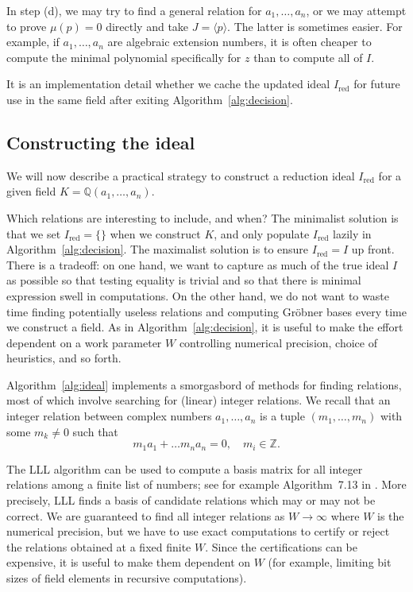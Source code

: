 \documentclass[sigconf,screen,urlbreakonhyphens]{acmart}
\begin{document}
In step (d), we may try to find a general relation
for $a_1,\ldots,a_n$,
or we may attempt to prove $\mu(p) = 0$ directly
and take $J = \langle p \rangle$. The latter is sometimes easier.
For example, if $a_1,\ldots,a_n$ are algebraic extension numbers,
it is often cheaper to compute the minimal polynomial
specifically for $z$ than to compute all of $I$.

It is an implementation detail whether we cache the updated
ideal $I_{\text{red}}$ for future use
in the same field after exiting Algorithm~\ref{alg:decision}.

\subsection{Constructing the ideal}

\label{sect:ideal}

We will now describe a practical strategy to construct a reduction ideal
$I_{\text{red}}$ for a given field $K = \mathbb{Q}(a_1,\ldots,a_n)$.

Which relations are interesting to include, and when?
The minimalist solution is that we set $I_{\text{red}} = \{\}$
when we construct $K$, and only populate $I_{\text{red}}$
lazily in Algorithm~\ref{alg:decision}.
The maximalist solution is to ensure
$I_{\text{red}} = I$ up front.
There is a tradeoff: on one hand, we want to capture as much of 
the true ideal $I$ as possible so that testing equality is trivial
and so that there is minimal expression swell in computations.
On the other hand, we do not want to waste time
finding potentially useless relations and computing Gr\"{o}bner bases every time we construct
a field.
As in Algorithm~\ref{alg:decision}, it is useful to
make the effort dependent on a work parameter $W$
controlling numerical precision, choice of heuristics,
and so forth.

Algorithm~\ref{alg:ideal} implements a smorgasbord of methods for
finding relations, most of which involve
searching for (linear) integer relations.
We recall that an integer relation between
complex numbers $a_1,\ldots,a_n$ is a tuple $(m_1, \ldots, m_n)$ with some $m_k \ne 0$
such that
$$m_1 a_1 + \ldots m_n a_n = 0, \quad m_i \in \mathbb{Z}.$$

The LLL algorithm can be used to compute a basis
matrix for all integer relations among
a finite list of numbers; see for example Algorithm~7.13 in \cite{Kau2005}.
More precisely, LLL finds a basis of candidate
relations which may or may not be correct.
We are guaranteed to find all integer relations
as $W \to \infty$ where $W$ is the numerical precision,
but we have to use exact computations to certify or reject the relations
obtained at a fixed finite $W$. Since the certifications can
be expensive, it is useful to make them dependent on $W$ (for
example, limiting bit sizes of field elements in recursive computations).
\end{document}
